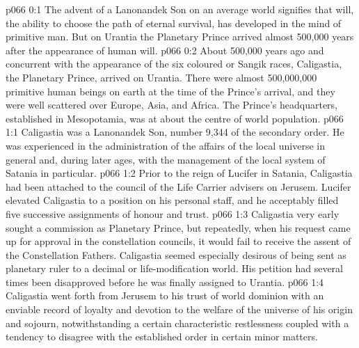 \author{Melchizedek}
\vs p066 0:1 The advent of a Lanonandek Son on an average world signifies that will, the ability to choose the path of eternal survival, has developed in the mind of primitive man. But on Urantia the Planetary Prince arrived almost 500,000 years after the appearance of human will.
\vs p066 0:2 About 500,000 years ago and concurrent with the appearance of the six coloured or Sangik races, Caligastia, the Planetary Prince, arrived on Urantia. There were almost 500,000,000 primitive human beings on earth at the time of the Prince’s arrival, and they were well scattered over Europe, Asia, and Africa. The Prince’s headquarters, established in Mesopotamia, was at about the centre of world population.
\vs p066 1:1 Caligastia was a Lanonandek Son, number 9,344 of the secondary order. He was experienced in the administration of the affairs of the local universe in general and, during later ages, with the management of the local system of Satania in particular.
\vs p066 1:2 Prior to the reign of Lucifer in Satania, Caligastia had been attached to the council of the Life Carrier advisers on Jerusem. Lucifer elevated Caligastia to a position on his personal staff, and he acceptably filled five successive assignments of honour and trust.
\vs p066 1:3 \pc Caligastia very early sought a commission as Planetary Prince, but repeatedly, when his request came up for approval in the constellation councils, it would fail to receive the assent of the Constellation Fathers. Caligastia seemed especially desirous of being sent as planetary ruler to a decimal or life\hyp{}modification world. His petition had several times been disapproved before he was finally assigned to Urantia.
\vs p066 1:4 Caligastia went forth from Jerusem to his trust of world dominion with an enviable record of loyalty and devotion to the welfare of the universe of his origin and sojourn, notwithstanding a certain characteristic restlessness coupled with a tendency to disagree with the established order in certain minor matters.
